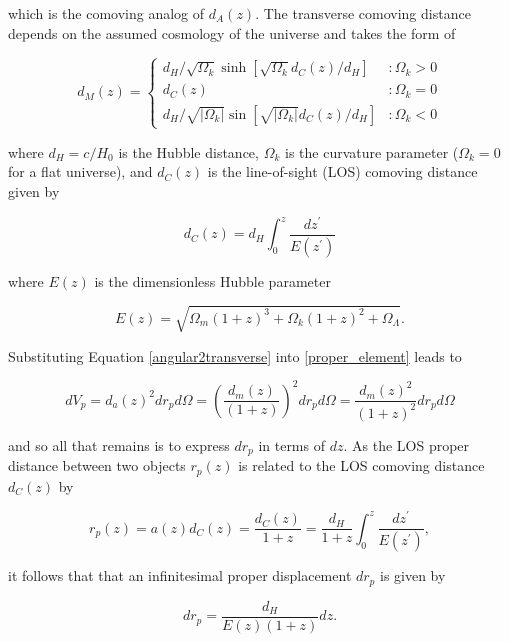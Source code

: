 \documentclass[12pt]{article}
\begin{document}
which is the comoving analog of $d_A(z)$. The transverse comoving distance depends on the assumed cosmology of the universe and takes the form of

\begin{equation}\label{comoving_transverse}
d_M(z)=\left\{
     \begin{array}{lr}
       d_H/\sqrt{\Omega_k}\sinh\left[\sqrt{\Omega_k}d_C(z)/d_H\right] & : \Omega_k>0\\
       d_C(z) & : \Omega_k=0\\
       d_H/\sqrt{|\Omega_k|}\sin\left[\sqrt{|\Omega_k|}d_C(z)/d_H\right] & : \Omega_k<0
     \end{array}
   \right.
\end{equation}

where $d_H=c/H_0$ is the Hubble distance, $\Omega_k$ is the curvature parameter ($\Omega_k=0$ for a flat universe), and $d_C(z)$ is the line-of-sight (LOS) comoving distance given by

\begin{equation}\label{comoving_distance}
d_C(z)=d_H\int_0^z\frac{dz^\prime}{E(z^\prime)}
\end{equation}

where $E(z)$ is the dimensionless Hubble parameter

\begin{equation}\label{dim_hubble_parameter}
E(z)=\sqrt{\Omega_m(1+z)^3+\Omega_k(1+z)^2+\Omega_\Lambda}.
\end{equation}

Substituting Equation \eqref{angular2transverse} into \eqref{proper_element} leads to

\begin{equation}\label{temp_solution}
dV_p=d_a(z)^2dr_pd\Omega=\left(\frac{d_m(z)}{(1+z)}\right)^2dr_pd\Omega=\frac{d_m(z)^2}{(1+z)^2}dr_pd\Omega
\end{equation}

and so all that remains is to express $dr_p$ in terms of $dz$. As the LOS proper distance between two objects $r_p(z)$ is related to the LOS comoving distance $d_C(z)$ by

\begin{equation}\label{physical2comoving}
r_p(z)=a(z)d_C(z)=\frac{d_C(z)}{1+z}=\frac{d_H}{1+z}\int_0^z\frac{dz^\prime}{E(z^\prime)},
\end{equation}

it follows that that an infinitesimal proper displacement $dr_p$ is given by

\begin{equation}\label{physical2comoving_inf}
dr_p=\frac{d_H}{E(z)(1+z)}dz.
\end{equation}
\end{document}

